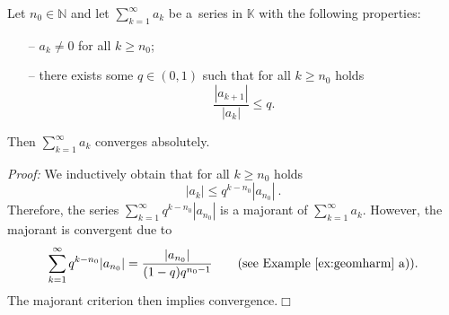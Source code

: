 

\begin{Theorem}
\label{thm:quotkrit}
Let $n_0\in\mathbb{N}$ and let $\sum_{k=1}^\infty a_k$ be a~series in $\mathbb{K}$ with the following properties:
\begin{itemize}
 \item[--] $a_k\neq0$ for all $k\geq n_0$;
 \item[--] there exists some $q\in(0,1)$ such that for all $k\geq n_0$ holds
\[\frac{|a_{k+1}|}{|a_{k}|}\leq q.\]
\end{itemize}
Then $\sum_{k=1}^\infty a_k$ converges absolutely.
\end{Theorem}
%
{\em Proof:} We inductively obtain that for all $k\geq n_0$ holds
\[|a_k|\leq q^{k-n_0}|a_{n_0}| \ .\]
Therefore, the series $\sum_{k=1}^\infty q^{k-n_0}|a_{n_0}|$ is a majorant of $\sum_{k=1}^\infty a_k$. However, the majorant is convergent due to
\[\sum_{k=1}^\infty q^{k-n_0}|a_{n_0}|=\frac{|a_{n_0}|}{(1-q)q^{n_0-1}}\qquad\text{(see Example~\ref{ex:geomharm} a))}.\]
The majorant criterion then implies convergence.$\Box$

